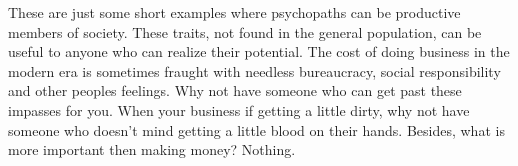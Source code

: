 \documentclass[12pt,jou]{apa}
\begin{document}
These are just some short examples where psychopaths can be productive members
of society. These traits, not found in the general population, can be useful to
anyone who can realize their potential. The cost of doing business in the modern
era is sometimes fraught with needless bureaucracy, social responsibility and
other peoples feelings. Why not have someone who can get past these impasses for
you. When your business if getting a little dirty, why not have someone who
doesn't mind getting a little blood on their hands. Besides, what is more
important then making money? Nothing. 
\newpage

\end{document}
